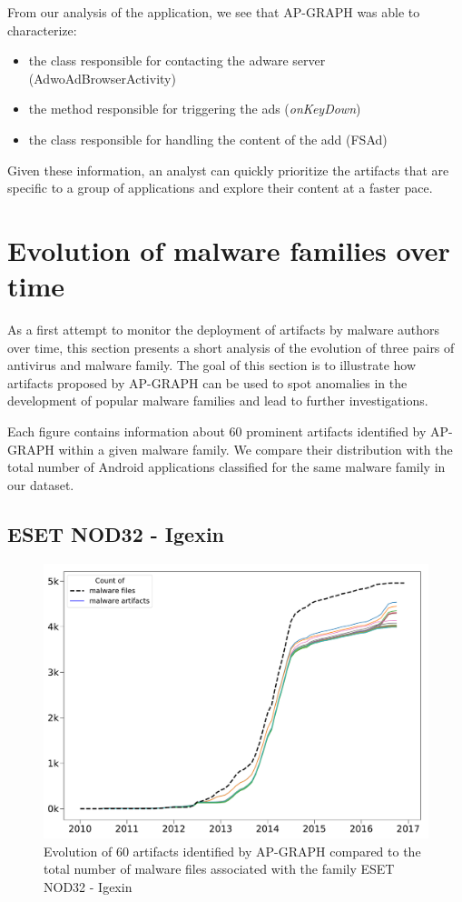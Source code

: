 From our analysis of the application, we see that AP-GRAPH was able to characterize:

\begin{itemize}
	\item the class responsible for contacting the adware server (AdwoAdBrowserActivity)
	\item the method responsible for triggering the ads (\textit{onKeyDown})
	\item the class responsible for handling the content of the add (FSAd)
\end{itemize}

Given these information, an analyst can quickly prioritize the artifacts that are specific to a group of applications and explore their content at a faster pace.
\section{Evolution of malware families over time}
As a first attempt to monitor the deployment of artifacts by malware authors over time, this section presents a short analysis of the evolution of three pairs of antivirus and malware family.
The goal of this section is to illustrate how artifacts proposed by AP-GRAPH can be used to spot anomalies in the development of popular malware families and lead to further investigations.

Each figure contains information about 60 prominent artifacts identified by AP-GRAPH within a given malware family.
We compare their distribution with the total number of Android applications classified for the same malware family in our dataset.
\subsection{ESET NOD32 - Igexin}

\begin{figure}[!ht]
        \centering
	\includegraphics[width=0.85\linewidth]{figures/apgraph/artifacts/eset-nod32_igexin.pdf}
        \caption[Evolution of artifacts identified by AP-GRAPH for ESET NOD32 - Igexin]{Evolution of 60 artifacts identified by AP-GRAPH compared to the total number of malware files associated with the family ESET NOD32 - Igexin}
	\label{figure:apgraph:artifacts:igexin}
\end{figure}

